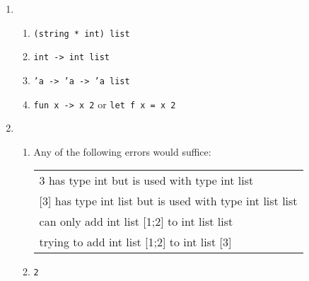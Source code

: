 \documentclass[11pt]{article}
\begin{document}

  \begin{enumerate}

    \addtolength{\itemsep}{8mm}

    \item \begin{enumerate}

            \addtolength{\itemsep}{0mm}

            \item \texttt{(string * int) list}

            \item \texttt{int -> int list}

            \item \texttt{'a -> 'a -> 'a list}

            \item \texttt{fun x -> x 2} or \texttt{let f x = x 2}

          \end{enumerate}

          \vspace{-2.5mm}

    \item \begin{enumerate}

            \addtolength{\itemsep}{0mm}

            \item Any of the following errors would suffice:

                  \begin{tabular}[t]{l}

                    3 has type int but is used with type int list
                    \\

                    [3] has type int list but is used with type int list list
                    \\

                    can only add int list [1;2] to int list list
                    \\

                    trying to add int list [1;2] to int list [3]
                    \\

                  \end{tabular}

            \item \texttt{2}


\end{enumerate}
\end{enumerate}
\end{document}
